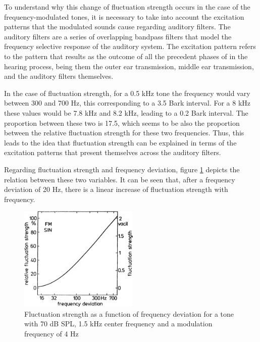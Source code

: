 To understand why this change of fluctuation strength occurs in the case of the
frequency-modulated tones, it is necessary to take into account the excitation
patterns that the modulated sounds cause regarding auditory filters. The
auditory filters are a series of overlapping bandpass filters that model the
frequency selective response of the auditory system. The excitation pattern
refers to the pattern that results as the outcome of all the precedent phases of
in the hearing process, being them the outer ear transmission, middle ear
transmission, and the auditory filters themselves.

In the case of fluctuation strength, for a 0.5 kHz tone the frequency would vary
between 300 and 700 Hz, this corresponding to a 3.5 Bark interval. For a 8 kHz
these values would be 7.8 kHz and 8.2 kHz, leading to a 0.2 Bark interval. The
proportion between these two is 17.5, which seems to be also the proportion
between the relative fluctuation strength for these two frequencies. Thus, this
leads to the idea that fluctuation strength can be explained in terms of the
excitation patterns that present themselves across the auditory filters.

Regarding fluctuation strength and frequency deviation, figure
\ref{fig:flucstrenvsfreqdev} depicts the relation between these two variables.
It can be seen that, after a frequency deviation of 20 Hz, there is a linear
increase of fluctuation strength with frequency.

\begin{figure}
    \centering
    \includegraphics[height=5cm]
        {img/Fastl2007-FluctuationStrengthVsFrequencyDeviation}
    \caption{Fluctuation strength as a function of frequency deviation for a
        tone with 70 dB SPL, 1.5 kHz center frequency and a modulation frequency
        of 4 Hz \cite[pp. 251]{Fastl2007Psychoacoustics}}
    \label{fig:flucstrenvsfreqdev}
\end{figure}

